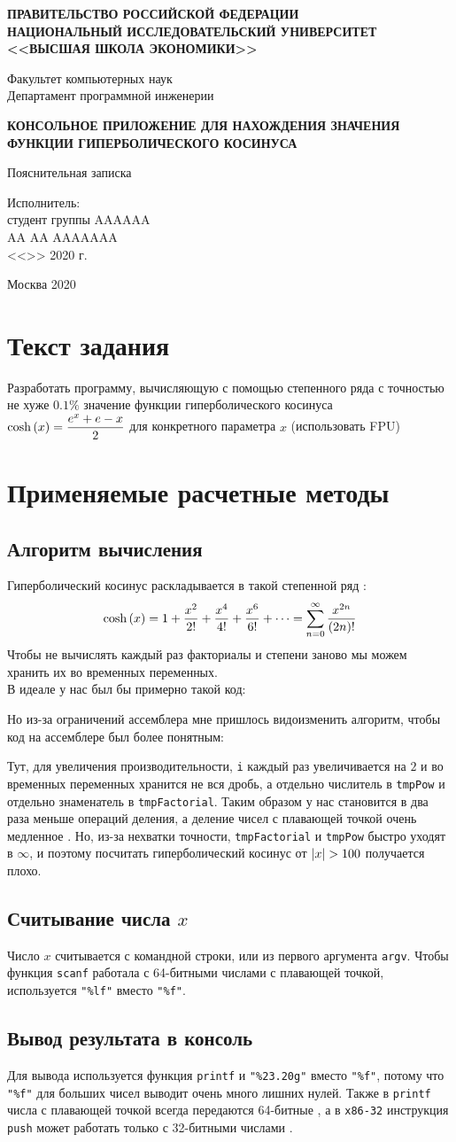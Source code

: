 \documentclass[a4paper]{article}
\newcommand{\titlePage}{
  \begin{center}
    \Large
    \textbf{
      ПРАВИТЕЛЬСТВО РОССИЙСКОЙ ФЕДЕРАЦИИ \\
      НАЦИОНАЛЬНЫЙ ИССЛЕДОВАТЕЛЬСКИЙ УНИВЕРСИТЕТ \\
      <<ВЫСШАЯ ШКОЛА ЭКОНОМИКИ>> \\
    }
    \par\vspace{5mm}
    Факультет компьютерных наук \\
    Департамент программной инженерии \\
  \end{center}
  \vspace*{\fill}
  \begin{center}
    \Large\bf
    КОНСОЛЬНОЕ ПРИЛОЖЕНИЕ ДЛЯ НАХОЖДЕНИЯ ЗНАЧЕНИЯ ФУНКЦИИ ГИПЕРБОЛИЧЕСКОГО КОСИНУСА
    \par
    Пояснительная записка
  \end{center}
  \vspace*{\fill}
  \begin{flushright}
		Исполнитель: \\ студент группы AAAAAA \\
		\underline{\hspace{4cm}} AA AA AAAAAAA \\
		<<\underline{\hspace{1cm}}>> \underline{\hspace{4cm}} 2020 г. \\
  \end{flushright}
  \vspace*{\fill}
  \begin{center}Москва 2020\end{center}
}
\newcommand{\frameCode}[1]{
  \begin{center}
    \begin{minipage}{0.5\textwidth}
      \VerbatimInput[frame=single]{#1}
    \end{minipage}
  \end{center}
}
\begin{document}
  \titlePage
  \newpage
  \tableofcontents
  \newpage

  \section{Текст задания}
  Разработать программу, вычисляющую с помощью степенного ряда с точностью не хуже $0.1\%$ значение функции
  гиперболического косинуса $\displaystyle\cosh\left(x\right) = \frac{e^x+e-x}{2}$ для конкретного параметра $x$ (использовать FPU) \cite{task}

  \newpage
  \section{Применяемые расчетные методы}
  \subsection{Алгоритм вычисления}
  Гиперболический косинус раскладывается в такой степенной ряд \cite{cosh}:
  $$ \cosh\left(x\right) = 1 + \frac{x^2}{2!} + \frac{x^4}{4!} + \frac{x^6}{6!} + \cdots = \sum_{n=0}^\infty \frac{x^{2n}}{(2n)!} $$
  Чтобы не вычислять каждый раз факториалы и степени заново мы можем хранить их во временных переменных. \\
  В идеале у нас был бы примерно такой код:
  \frameCode{../asm/mp01/algo.c}
  Но из-за ограничений ассемблера мне пришлось видоизменить алгоритм, чтобы код на ассемблере был более понятным:
  \frameCode{../asm/mp01/impl.c}
  Тут, для увеличения производительности, \texttt{i} каждый раз увеличивается на $2$ и во временных переменных хранится не вся дробь,
  а отдельно числитель в \texttt{tmpPow} и отдельно знаменатель в \texttt{tmpFactorial}.
  Таким образом у нас становится в два раза меньше операций деления, а деление чисел с плавающей точкой очень медленное \cite{fdiv}.
  Но, из-за нехватки точности, \texttt{tmpFactorial} и \texttt{tmpPow} быстро уходят в $\infty$,
  и поэтому посчитать гиперболический косинус от $\left|x\right| > 100$ получается плохо.

  \subsection{Считывание числа $x$}
  Число $x$ считывается с командной строки, или из первого аргумента \texttt{argv}.
  Чтобы функция \texttt{scanf} работала с 64-битными числами с плавающей точкой,
  используется \texttt{"\%lf"} вместо \texttt{"\%f"}.

  \subsection{Вывод результата в консоль}
  Для вывода используется функция \texttt{printf} и \texttt{"\%23.20g"} вместо \texttt{"\%f"},
  потому что \texttt{"\%f"} для больших чисел выводит очень много лишних нулей.
  Также в \texttt{printf} числа с плавающей точкой всегда передаются 64-битные \cite{promo},
  а в \texttt{x86-32} инструкция \texttt{push} может работать только с 32-битными числами \cite{x86}.
\end{document}
